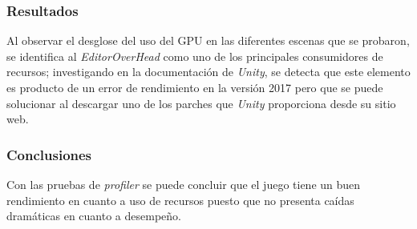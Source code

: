 \subsubsection{Resultados}
Al observar el desglose del uso del GPU en las diferentes escenas que se
probaron, se identifica al \textit{EditorOverHead} como uno de los principales
consumidores de recursos; investigando en la documentación de \textit{Unity},
se detecta que este elemento es producto de un error de rendimiento en la
versión 2017 pero que se puede solucionar al descargar uno de los parches que
\textit{Unity} proporciona desde su sitio web.
\subsubsection{Conclusiones}
Con las pruebas de \textit{profiler} se puede concluir que el juego tiene un buen
rendimiento en cuanto a uso de recursos puesto que no presenta caídas
dramáticas en cuanto a desempeño. 